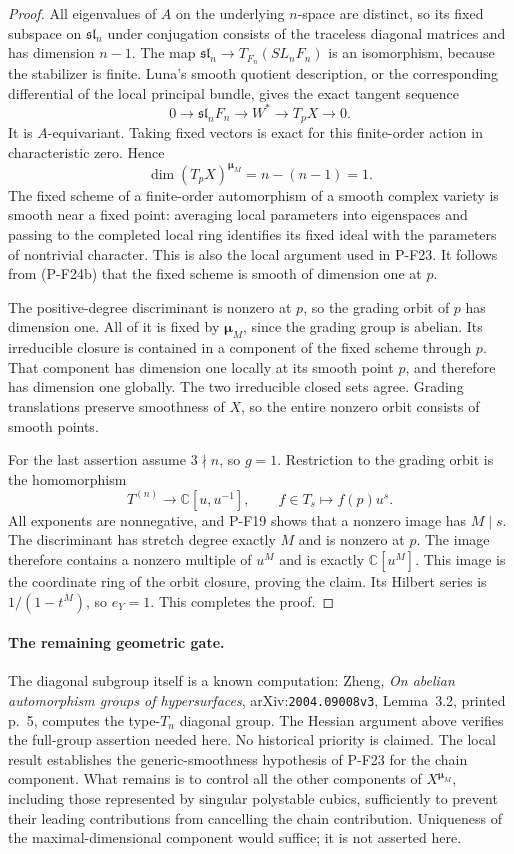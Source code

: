 \documentclass[11pt,a4paper]{article}
\begin{document}
\begin{proof}
All eigenvalues of $A$ on the underlying $n$-space are
distinct, so its fixed subspace on $\mathfrak{sl}_n$
under conjugation consists of the traceless diagonal
matrices and has dimension $n-1$. The map
$\mathfrak{sl}_n\to T_{F_n}(SL_nF_n)$ is an isomorphism,
because the stabilizer is finite. Luna's smooth quotient
description, or the corresponding differential of the
local principal bundle, gives the exact tangent sequence
\[
 0\longrightarrow\mathfrak{sl}_n F_n
 \longrightarrow W^*
 \longrightarrow T_pX\longrightarrow0.
\]
It is $A$-equivariant. Taking fixed vectors is exact for
this finite-order action in characteristic zero. Hence
\[
 \dim(T_pX)^{\boldsymbol\mu_M}=n-(n-1)=1.
 \tag{P-F24b}
\]
The fixed scheme of a finite-order automorphism of a
smooth complex variety is smooth near a fixed point:
averaging local parameters into eigenspaces and passing
to the completed local ring identifies its fixed ideal
with the parameters of nontrivial character. This is
also the local argument used in P-F23. It follows from
(P-F24b) that the fixed scheme is smooth of dimension one
at $p$.

The positive-degree discriminant is nonzero at $p$, so
the grading orbit of $p$ has dimension one. All of it
is fixed by $\boldsymbol\mu_M$, since the grading group
is abelian. Its irreducible closure is contained in a
component of the fixed scheme through $p$. That component
has dimension one locally at its smooth point $p$, and
therefore has dimension one globally. The two irreducible
closed sets agree. Grading translations preserve smoothness
of $X$, so the entire nonzero orbit consists of smooth
points.

For the last assertion assume $3\nmid n$, so $g=1$.
Restriction to the grading orbit is the homomorphism
\[
 T^{(n)}\longrightarrow\mathbb C[u,u^{-1}],\qquad
 f\in T_s\longmapsto f(p)u^s.
\]
All exponents are nonnegative, and P-F19 shows that a
nonzero image has $M\mid s$. The discriminant has stretch
degree exactly $M$ and is nonzero at $p$. The image therefore
contains a nonzero multiple of $u^M$ and is exactly
$\mathbb C[u^M]$. This image is the coordinate ring of
the orbit closure, proving the claim. Its Hilbert series is
$1/(1-t^M)$, so $e_Y=1$. This completes the proof.
\end{proof}

\paragraph{The remaining geometric gate.}
The diagonal subgroup itself is a known computation:
Zheng, \emph{On abelian automorphism groups of hypersurfaces},
arXiv:\texttt{2004.09008v3}, Lemma~3.2, printed p.~5,
computes the type-$T_n$ diagonal group. The Hessian argument
above verifies the full-group assertion needed here.
No historical priority is claimed. The local result establishes
the generic-smoothness hypothesis of P-F23 for the chain component.
What remains is to control all the other components of
$X^{\boldsymbol\mu_M}$, including those represented by
singular polystable cubics, sufficiently to prevent their
leading contributions from cancelling the chain contribution.
Uniqueness of the maximal-dimensional component would suffice;
it is not asserted here.
\end{document}
